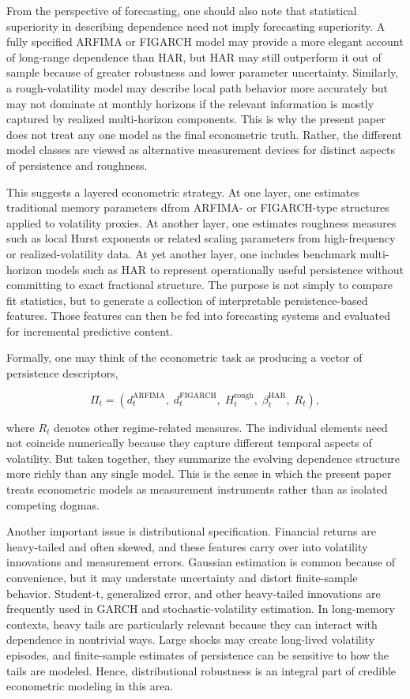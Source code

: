 \documentclass[12pt]{article}
\begin{document}
From the perspective of forecasting, one should also note that statistical superiority in describing dependence need not imply forecasting superiority. A fully specified ARFIMA or FIGARCH model may provide a more elegant account of long-range dependence than HAR, but HAR may still outperform it out of sample because of greater robustness and lower parameter uncertainty. Similarly, a rough-volatility model may describe local path behavior more accurately but may not dominate at monthly horizons if the relevant information is mostly captured by realized multi-horizon components. This is why the present paper does not treat any one model as the final econometric truth. Rather, the different model classes are viewed as alternative measurement devices for distinct aspects of persistence and roughness.

This suggests a layered econometric strategy. At one layer, one estimates traditional memory parameters dfrom ARFIMA- or FIGARCH-type structures applied to volatility proxies. At another layer, one estimates roughness measures such as local Hurst exponents or related scaling parameters from high-frequency or realized-volatility data. At yet another layer, one includes benchmark multi-horizon models such as HAR to represent operationally useful persistence without committing to exact fractional structure. The purpose is not simply to compare fit statistics, but to generate a collection of interpretable persistence-based features. Those features can then be fed into forecasting systems and evaluated for incremental predictive content.

Formally, one may think of the econometric task as producing a vector of persistence descriptors,

\[\Pi_t = (d_t^{\mathrm{ARFIMA}},\; d_t^{\mathrm{FIGARCH}},\; H_t^{\mathrm{rough}},\; \beta_t^{\mathrm{HAR}},\; R_t),\]

where $R_t$ denotes other regime-related measures. The individual elements need not coincide numerically because they capture different temporal aspects of volatility. But taken together, they summarize the evolving dependence structure more richly than any single model. This is the sense in which the present paper treats econometric models as measurement instruments rather than as isolated competing dogmas.

Another important issue is distributional specification. Financial returns are heavy-tailed and often skewed, and these features carry over into volatility innovations and measurement errors. Gaussian estimation is common because of convenience, but it may understate uncertainty and distort finite-sample behavior. Student-t, generalized error, and other heavy-tailed innovations are frequently used in GARCH and stochastic-volatility estimation. In long-memory contexts, heavy tails are particularly relevant because they can interact with dependence in nontrivial ways. Large shocks may create long-lived volatility episodes, and finite-sample estimates of persistence can be sensitive to how the tails are modeled. Hence, distributional robustness is an integral part of credible econometric modeling in this area.
\end{document}
